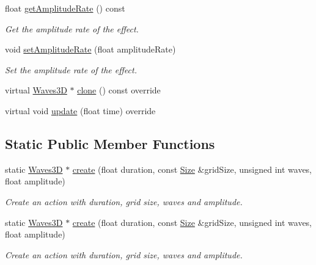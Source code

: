 \begin{DoxyCompactItemize}
float \hyperlink{classWaves3D_a1695dd124fd56fe1ec1c7102d26db794}{get\+Amplitude\+Rate} () const
\begin{DoxyCompactList}\small\item\em Get the amplitude rate of the effect. \end{DoxyCompactList}\item 
void \hyperlink{classWaves3D_a9ab0956b09066554cf41f0bd38749495}{set\+Amplitude\+Rate} (float amplitude\+Rate)
\begin{DoxyCompactList}\small\item\em Set the amplitude rate of the effect. \end{DoxyCompactList}\item 
virtual \hyperlink{classWaves3D}{Waves3D} $\ast$ \hyperlink{classWaves3D_a7f9f49bce0ebd46fc200d208a984b5bf}{clone} () const override
\item 
virtual void \hyperlink{classWaves3D_a89e5e21533760e4193b50354652b57fb}{update} (float time) override
\end{DoxyCompactItemize}
\subsection*{Static Public Member Functions}
\begin{DoxyCompactItemize}
\item 
static \hyperlink{classWaves3D}{Waves3D} $\ast$ \hyperlink{classWaves3D_ae7e3043edbe596af35f249e0d5ed838f}{create} (float duration, const \hyperlink{classSize}{Size} \&grid\+Size, unsigned int waves, float amplitude)
\begin{DoxyCompactList}\small\item\em Create an action with duration, grid size, waves and amplitude. \end{DoxyCompactList}\item 
static \hyperlink{classWaves3D}{Waves3D} $\ast$ \hyperlink{classWaves3D_ad2fe487d343832bc78c3122e96d77012}{create} (float duration, const \hyperlink{classSize}{Size} \&grid\+Size, unsigned int waves, float amplitude)
\begin{DoxyCompactList}\small\item\em Create an action with duration, grid size, waves and amplitude. \end{DoxyCompactList}\end{DoxyCompactItemize}
